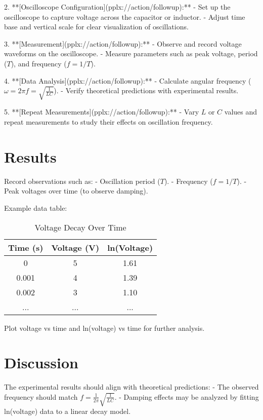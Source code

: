 \documentclass[a4paper,12pt]{article}
\begin{document}
2. **[Oscilloscope Configuration](pplx://action/followup):**
   - Set up the oscilloscope to capture voltage across the capacitor or inductor.
   - Adjust time base and vertical scale for clear visualization of oscillations.

3. **[Measurement](pplx://action/followup):**
   - Observe and record voltage waveforms on the oscilloscope.
   - Measure parameters such as peak voltage, period (\(T\)), and frequency (\(f = 1/T\)).

4. **[Data Analysis](pplx://action/followup):**
   - Calculate angular frequency (\(\omega = 2\pi f = \sqrt{\frac{1}{LC}}\)).
   - Verify theoretical predictions with experimental results.

5. **[Repeat Measurements](pplx://action/followup):**
   - Vary \(L\) or \(C\) values and repeat measurements to study their effects on oscillation frequency.

\section{Results}

Record observations such as:
- Oscillation period (\(T\)).
- Frequency (\(f = 1/T\)).
- Peak voltages over time (to observe damping).

Example data table:

\begin{table}[H]
    \centering
    \begin{tabular}{|c|c|c|}
        \hline
        Time (s) & Voltage (V) & ln(Voltage) \\ 
        \hline
        0 & 5 & 1.61 \\ 
        0.001 & 4 & 1.39 \\ 
        0.002 & 3 & 1.10 \\ 
        ... & ... & ... \\ 
        \hline
    \end{tabular}
    \caption{Voltage Decay Over Time}
    \label{tab:data}
\end{table}

Plot voltage vs time and ln(voltage) vs time for further analysis.

\section{Discussion}

The experimental results should align with theoretical predictions:
- The observed frequency should match \(f = \frac{1}{2\pi}\sqrt{\frac{1}{LC}}\).
- Damping effects may be analyzed by fitting ln(voltage) data to a linear decay model.
\end{document}
